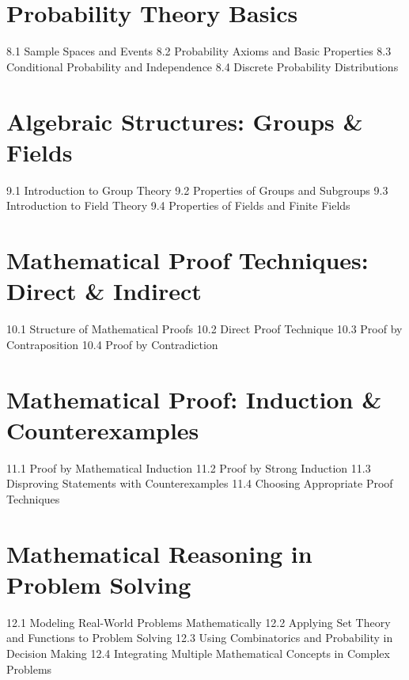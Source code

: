 \section{Probability Theory Basics}
8.1 Sample Spaces and Events
8.2 Probability Axioms and Basic Properties
8.3 Conditional Probability and Independence
8.4 Discrete Probability Distributions
\section{Algebraic Structures: Groups \& Fields}
9.1 Introduction to Group Theory
9.2 Properties of Groups and Subgroups
9.3 Introduction to Field Theory
9.4 Properties of Fields and Finite Fields
\section{Mathematical Proof Techniques: Direct \& Indirect}
10.1 Structure of Mathematical Proofs
10.2 Direct Proof Technique
10.3 Proof by Contraposition
10.4 Proof by Contradiction
\section{Mathematical Proof: Induction \& Counterexamples}
11.1 Proof by Mathematical Induction
11.2 Proof by Strong Induction
11.3 Disproving Statements with Counterexamples
11.4 Choosing Appropriate Proof Techniques
\section{Mathematical Reasoning in Problem Solving}
12.1 Modeling Real-World Problems Mathematically
12.2 Applying Set Theory and Functions to Problem Solving
12.3 Using Combinatorics and Probability in Decision Making
12.4 Integrating Multiple Mathematical Concepts in Complex Problems

